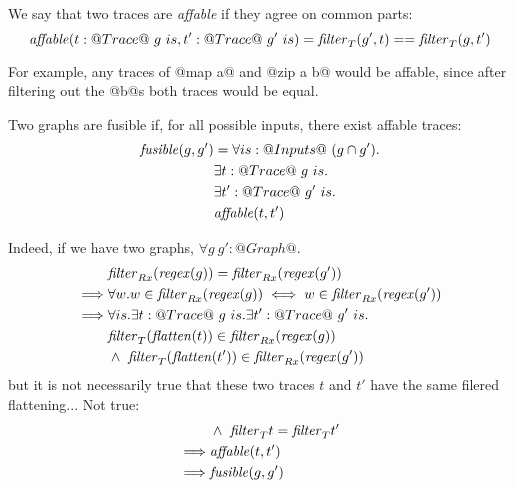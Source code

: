 We say that two traces are \emph{affable} if they agree on common parts:
\[ \mathit{affable}(t : @Trace@~g~is, t' : @Trace@~g'~is) = \mathit{filter}_{T}(g', t) == \mathit{filter}_{T}(g, t') \]

For example, any traces of @map a@ and @zip a b@ would be affable, since after filtering out the @b@s both traces would be equal.

Two graphs are fusible if, for all possible inputs, there exist affable traces:
\begin{align*}
\mathit{fusible}(g, g')
        &=  \forall is : @Inputs@~(g \cap g').  \\
        &   \exists t  : @Trace@~g~is.          \\
        &   \exists t' : @Trace@~g'~is.         \\
        &   \affable(t, t')                     %
\end{align*}


Indeed, if we have two graphs, $\forall g~g' : @Graph@.$
\begin{eqnarray*}
 & \mathit{filter}_{Rx}(\mathit{regex}(g)) = \mathit{filter}_{Rx}(\mathit{regex}(g')) \\
 \implies & \forall w. w \in \mathit{filter}_{Rx}(\mathit{regex}(g)) \iff w \in \mathit{filter}_{Rx}(\mathit{regex}(g')) \\
 \implies & \forall is. \exists t : @Trace@~g~is. \exists t' : @Trace@~g'~is. \\
          & \mathit{filter}_{T}(\mathit{flatten}(t)) \in \mathit{filter}_{Rx}(\mathit{regex}(g)) \\
          & \wedge~\mathit{filter}_{T}(\mathit{flatten}(t')) \in \mathit{filter}_{Rx}(\mathit{regex}(g')) \\
\end{eqnarray*}
but it is not necessarily true that these two traces $t$ and $t'$ have the same filered flattening...
Not true:
\begin{eqnarray*}
          & \wedge~\mathit{filter}_{T} t = \mathit{filter}_{T} t' \\
 \implies & \mathit{affable}(t, t') \\
 \implies & \mathit{fusible}(g, g') \\
\end{eqnarray*}

